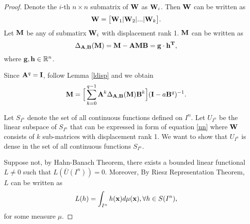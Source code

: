 \documentclass{article}
\begin{document}
\begin{proof}
Denote the $i$-th $n\times n$ submatrix of ${\bf W}$ as ${\bf W}_i$. Then ${\bf W}$ can be written as
\begin{equation}
{\bf W} = \big[{\bf W}_1|{\bf W}_2|...|{\bf W}_k\big].
\end{equation}
Let ${\bf M}$ be any of submatirx ${\bf W}_i$ with displacement rank 1. ${\bf M}$ can be written as
\begin{equation}
\Delta_{{\bf A},{\bf B}}({\bf M}) = {\bf M} - {\bf AMB} = {\bf g}\cdot {\bf h^T},
\end{equation}
where ${\bf g}, {\bf h}\in\mathbb{R}^n$.

Since ${\bf A}^q = {\bf I}$, follow Lemma \ref{ldisp} and we obtain
\begin{equation}
{\bf M} = \Big[\sum_{k=0}^{q-1}{\bf A}^k\Delta_{{\bf A},{\bf B}}({\bf M}){\bf B}^k\Big]({\bf I} - a{\bf B}^q)^{-1}.
\end{equation}

Let $S_{I^n}$ denote the set of all continuous functions defined on $I^n$. Let $U_{I^n}$ be the linear subspace of $S_{I^n}$ that can be expressed in form of equation \eqref{nn} where ${\bf W}$ consists of $k$ sub-matrices with displacement rank 1. We want to show that $U_{I^n}$ is dense in the set of all continuous functions $S_{I^n}$.

Suppose not, by Hahn-Banach Theorem, there exists a bounded linear functional $L\neq 0$ such that $L(\bar{U}(I^n))=0$.
Moreover, By Riesz Representation Theorem, $L$ can be written as
\begin{align*}
L(h) = \int_{I^n}h({\bf x})d\mu({\bf x}), \forall h\in S(I^n),
\end{align*}
for some measure $\mu$.


\end{proof}
\end{document}
